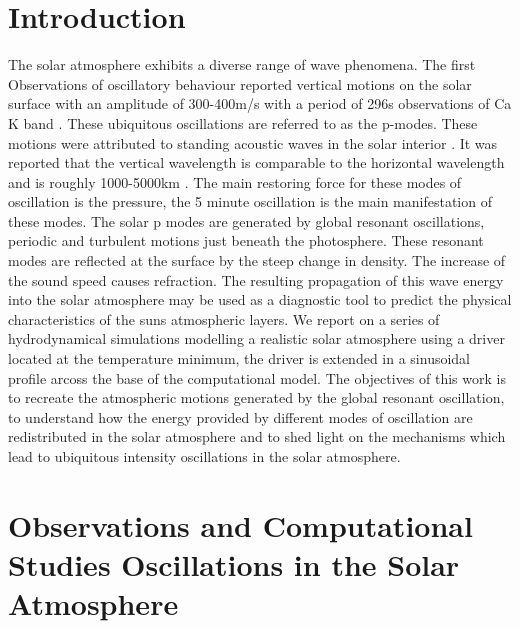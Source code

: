 \documentclass{aa}
\begin{document}

   \maketitle
%

\section{Introduction}

The solar atmosphere exhibits a diverse range of wave phenomena. The first Observations of oscillatory behaviour reported vertical motions on the solar surface with an amplitude of 300-400m/s with a period of 296s observations of Ca K band \cite{Leighton1960}. These ubiquitous oscillations are referred to as the p-modes.
These motions were attributed to standing acoustic waves in the solar interior \cite{Ulrich1970}. It was reported that the vertical wavelength is comparable to the horizontal wavelength and is roughly 1000-5000km \cite{Leibacher1971}.  The main restoring force for these modes of oscillation is the pressure, the 5 minute oscillation is the main manifestation of these modes.  The solar p modes are generated by global resonant oscillations, periodic  and turbulent motions just beneath the photosphere.  These resonant modes are reflected at the surface by the steep change in density. The increase of the sound speed causes refraction.   The resulting propagation of this wave energy into the solar atmosphere may be used as a diagnostic tool to predict the physical characteristics of the  suns atmospheric layers. We report on a series of hydrodynamical simulations modelling a realistic solar atmosphere using a driver located at the temperature minimum, the driver is extended in a sinusoidal profile arcoss the base of the computational model.  The objectives of this work is to recreate the atmospheric motions generated by the global resonant oscillation, to  understand how the energy provided by different modes of oscillation are redistributed in the solar atmosphere and to shed light on the mechanisms which lead to ubiquitous intensity oscillations in the solar atmosphere.   

\section{Observations and Computational Studies Oscillations in the Solar Atmosphere}
\end{document}
